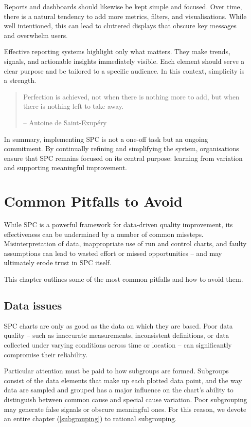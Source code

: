 \documentclass[
]{book}
\begin{document}
Reports and dashboards should likewise be kept simple and focused. Over time, there is a natural tendency to add more metrics, filters, and visualisations. While well intentioned, this can lead to cluttered displays that obscure key messages and overwhelm users.

Effective reporting systems highlight only what matters. They make trends, signals, and actionable insights immediately visible. Each element should serve a clear purpose and be tailored to a specific audience.
In this context, simplicity is a strength.

\begin{quote}
Perfection is achieved, not when there is nothing more to add, but when there is nothing left to take away.

-- Antoine de Saint-Exupéry
\end{quote}

In summary, implementing SPC is not a one-off task but an ongoing commitment. By continually refining and simplifying the system, organisations ensure that SPC remains focused on its central purpose: learning from variation and supporting meaningful improvement.

\chapter{Common Pitfalls to Avoid}\label{pitfalls}

While SPC is a powerful framework for data-driven quality improvement, its effectiveness can be undermined by a number of common missteps. Misinterpretation of data, inappropriate use of run and control charts, and faulty assumptions can lead to wasted effort or missed opportunities -- and may ultimately erode trust in SPC itself.

This chapter outlines some of the most common pitfalls and how to avoid them.

\section{Data issues}\label{data-issues}

SPC charts are only as good as the data on which they are based. Poor data quality -- such as inaccurate measurements, inconsistent definitions, or data collected under varying conditions across time or location -- can significantly compromise their reliability.

Particular attention must be paid to how subgroups are formed. Subgroups consist of the data elements that make up each plotted data point, and the way data are sampled and grouped has a major influence on the chart's ability to distinguish between common cause and special cause variation. Poor subgrouping may generate false signals or obscure meaningful ones. For this reason, we devote an entire chapter (\ref{subgrouping}) to rational subgrouping.
\end{document}
